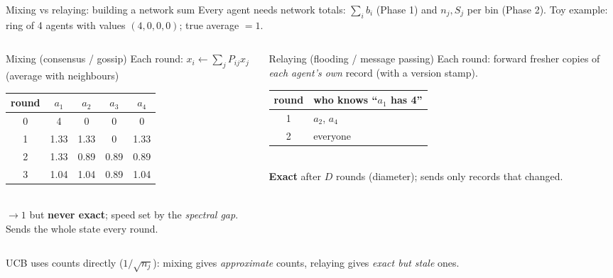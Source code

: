 \documentclass[11pt]{beamer}
\begin{document}
\begin{frame}{Mixing vs relaying: building a network sum}
\footnotesize
Every agent needs network totals: $\sum_i b_i$ (Phase 1) and $n_j,S_j$ per bin (Phase 2).
Toy example: ring of 4 agents with values $(4,0,0,0)$; true average $=1$.
\begin{columns}[T]
\begin{column}{0.49\textwidth}
\begin{block}{Mixing (consensus / gossip)}
Each round: $x_i\leftarrow\sum_j P_{ij}x_j$ \;(average with neighbours)\\[0.3em]
\scriptsize
\begin{tabular}{ccccc}
\toprule
round & $a_1$ & $a_2$ & $a_3$ & $a_4$\\
\midrule
0 & 4 & 0 & 0 & 0\\
1 & 1.33 & 1.33 & 0 & 1.33\\
2 & 1.33 & 0.89 & 0.89 & 0.89\\
3 & 1.04 & 1.04 & 0.89 & 1.04\\
\bottomrule
\end{tabular}\\[0.2em]
$\to1$ but \textbf{never exact}; speed set by the \emph{spectral gap}. Sends the whole state every round.
\end{block}
\end{column}
\begin{column}{0.49\textwidth}
\begin{block}{Relaying (flooding / message passing)}
Each round: forward fresher copies of \emph{each agent's own} record (with a version stamp).\\[0.3em]
\scriptsize
\begin{tabular}{cl}
\toprule
round & who knows ``$a_1$ has 4''\\
\midrule
1 & $a_2$, $a_4$\\
2 & everyone\\
\bottomrule
\end{tabular}\\[0.2em]
\textbf{Exact} after $D$ rounds (diameter); sends only records that changed.
\end{block}
\end{column}
\end{columns}
\vspace{0.1em}
\centering UCB uses counts directly ($1/\sqrt{n_j}$): mixing gives \emph{approximate} counts, relaying gives \emph{exact but stale} ones.
\end{frame}
\end{document}
